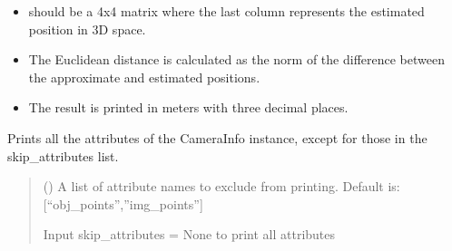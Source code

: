 \documentclass[letterpaper,10pt,english]{sphinxmanual}
\begin{document}
\begin{fulllineitems}
\begin{fulllineitems}
\begin{itemize}
\item {} 
\sphinxAtStartPar
{} should be a 4x4 matrix where the last column represents the estimated
position in 3D space.

\item {} 
\sphinxAtStartPar
The Euclidean distance is calculated as the norm of the difference between the
approximate and estimated positions.

\item {} 
\sphinxAtStartPar
The result is printed in meters with three decimal places.

\end{itemize}

\end{fulllineitems}


\begin{fulllineitems}
\label{\detokenize{CameraUtils:id21}}
\pysigstartsignatures
{}
\pysigstopsignatures
\sphinxAtStartPar
Prints all the attributes of the CameraInfo instance, except for those in the skip\_attributes list.
\begin{quote}\begin{description}
\sphinxAtStartPar
{} (\sphinxstyleliteralemphasis{\sphinxupquote{, }}) \textendash{} 
\sphinxAtStartPar
A list of attribute names to exclude from printing. Default is:
{[}“obj\_points”,”img\_points”{]}

\sphinxAtStartPar
Input skip\_attributes = None to print all attributes


\end{description}\end{quote}

\end{fulllineitems}



\end{fulllineitems}
\end{document}

